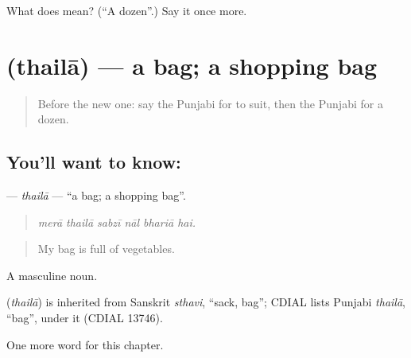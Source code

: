 \begin{tcolorbox}[breakable,colback=teal!4,colframe=teal!35!black,title={Before you move on}]
What does  mean? (\textquotedblleft{}A dozen\textquotedblright{}.) Say it once more.
\end{tcolorbox}
\section[\texorpdfstring{\pa{ਥੈਲਾ} (thailā)}{ਥੈਲਾ (thailā)}]{ (thailā) — a bag; a shopping bag}

\label{lesson:PA-C275-thaila}



\begin{quote}
Before the new one: say the Punjabi for to suit, then the Punjabi for a dozen.
\end{quote}

\subsection*{You'll want to know: }
\textbf{} — \emph{thailā} — \textquotedblleft{}a bag; a shopping bag\textquotedblright{}.

\begin{quote}
     
\end{quote}

\begin{quote}
\emph{merā thailā sabzī nāl bhariā hai.}
\end{quote}

\begin{quote}
My bag is full of vegetables.
\end{quote}

A masculine noun.

\begin{cousinweb}
\textbf{} (\emph{thailā}) is inherited from Sanskrit \emph{sthavi}, \textquotedblleft{}sack, bag\textquotedblright{}; CDIAL lists Punjabi \emph{thailā}, \textquotedblleft{}bag\textquotedblright{}, under it (CDIAL 13746).
\end{cousinweb}

\begin{grammarlens}[title={What you've built}]
One more word for this chapter.
\end{grammarlens}

